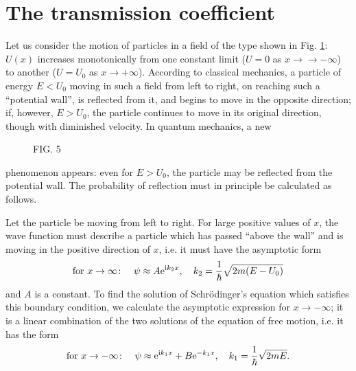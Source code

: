 \section{The transmission coefficient}\label{The transmission coefficient}
Let us consider the motion of particles in a field of the type shown in Fig. \ref{Fig.5}: $ U (x) $ increases monotonically from one constant limit ($ U = 0 $ as $ x →\to-\infty $) to another ($ U = U_0 $ as $ x\to +\infty $). According to classical mechanics, a particle of energy $ E < U_0 $ moving in such a field from left to right, on reaching such a “potential wall”, is reflected from it, and begins to move in the opposite direction; if, however, $ E > U_0 $, the particle continues to move in its original direction, though with diminished velocity. In quantum mechanics, a new\begin{wrapfigure}[]{l}[0cm]{0cm}
	\caption{FIG. 5}\label{Fig.5}
\end{wrapfigure}
phenomenon appears: even for $ E > U_0 $, the particle may be reflected from the potential wall. The probability of reflection must in principle be calculated as follows.




Let the particle be moving from left to right. For large positive values of $ x $, the wave function must describe a particle which has passed “above the wall” and is moving in the positive direction of $ x $, i.e. it must have the asymptotic form
\begin{equation}\label{25.1}
\text{for }x\to\infty\colon\quad\psi\approx A\mathrm{e}^{\mathrm{i} k_2 x},\quad k_2=\frac{1}{\hbar}\sqrt{2m(E-U_0)}
\end{equation}
and $ A $ is a constant. To find the solution of Schr\"odinger's equation which satisfies this boundary condition, we calculate the asymptotic expression for $ x \to-\infty $; it is a linear combination of the two solutions of the equation of free motion, i.e. it has the form
\begin{equation}\label{25.2}
\text{for }x\to-\infty\colon\quad\psi\approx \mathrm{e}^{\mathrm{i} k_1 x}+B\mathrm{e}^{-k_1 x},\quad k_1=\frac{1}{\hbar}\sqrt{2mE}.
\end{equation}


